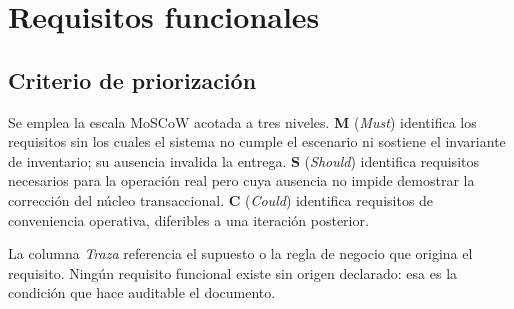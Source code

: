 \documentclass[10pt,letterpaper]{article}
\begin{document}
\section{Requisitos funcionales}
\label{sec:rf}

\subsection{Criterio de priorización}
Se emplea la escala MoSCoW acotada a tres niveles. \textbf{M} (\emph{Must}) identifica los requisitos sin los cuales el sistema no cumple el escenario ni sostiene el invariante de inventario; su ausencia invalida la entrega. \textbf{S} (\emph{Should}) identifica requisitos necesarios para la operación real pero cuya ausencia no impide demostrar la corrección del núcleo transaccional. \textbf{C} (\emph{Could}) identifica requisitos de conveniencia operativa, diferibles a una iteración posterior.

La columna \emph{Traza} referencia el supuesto o la regla de negocio que origina el requisito. Ningún requisito funcional existe sin origen declarado: esa es la condición que hace auditable el documento.
\end{document}
